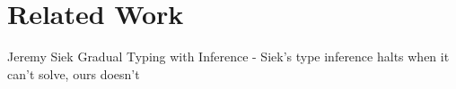 \section{Related Work}
\label{sec:related}

Jeremy Siek Gradual Typing with Inference
- Siek's type inference halts when it can't solve, ours doesn't

